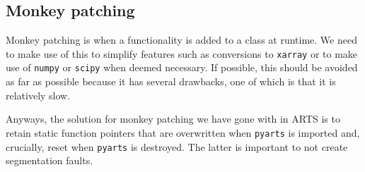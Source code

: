 \subsection{Monkey patching}
Monkey patching is when a functionality is added to a class at runtime.  We need to make use of this to simplify features such as
conversions to \verb|xarray| or to make use of \verb|numpy| or \verb|scipy| when deemed necessary.  If possible, this should be
avoided as far as possible because it has several drawbacks, one of which is that it is relatively slow.

Anyways, the solution for monkey patching we have gone with in ARTS is to retain static function pointers that are overwritten
when \verb|pyarts| is imported and, crucially, reset when \verb|pyarts| is destroyed.  The latter is important to not create
segmentation faults.


